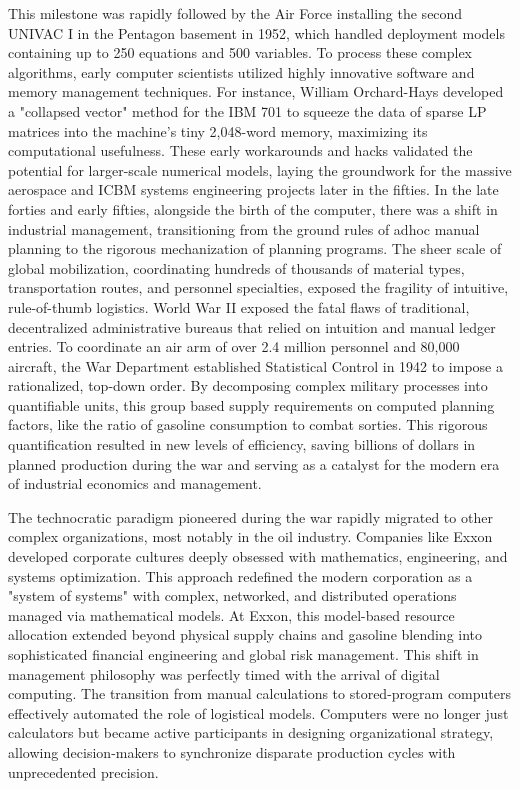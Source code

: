 This milestone was rapidly followed by the Air Force installing the second UNIVAC I in the Pentagon basement in 1952, which handled deployment models containing up to 250 equations and 500 variables. To process these complex algorithms, early computer scientists utilized highly innovative software and memory management techniques. For instance, William Orchard-Hays developed a "collapsed vector" method for the IBM 701 to squeeze the data of sparse LP matrices into the machine's tiny 2,048-word memory, maximizing its computational usefulness. These early workarounds and hacks validated the potential for larger-scale numerical models, laying the groundwork for the massive aerospace and ICBM systems engineering projects later in the fifties. In the late forties and early fifties, alongside the birth of the computer, there was a shift in industrial management, transitioning from the ground rules of adhoc manual planning to the rigorous mechanization of planning programs. The sheer scale of global mobilization, coordinating hundreds of thousands of material types, transportation routes, and personnel specialties, exposed the fragility of intuitive, rule-of-thumb logistics. World War II exposed the fatal flaws of traditional, decentralized administrative bureaus that relied on intuition and manual ledger entries. To coordinate an air arm of over 2.4 million personnel and 80,000 aircraft, the War Department established Statistical Control in 1942 to impose a rationalized, top-down order. By decomposing complex military processes into quantifiable units, this group based supply requirements on computed planning factors, like the ratio of gasoline consumption to combat sorties. This rigorous quantification resulted in new levels of efficiency, saving billions of dollars in planned production during the war and serving as a catalyst for the modern era of industrial economics and management. \cite{acombStatisticalControlArmy1952}

The technocratic paradigm pioneered during the war rapidly migrated to other complex organizations, most notably in the oil industry. Companies like Exxon developed corporate cultures deeply obsessed with mathematics, engineering, and systems optimization. This approach redefined the modern corporation as a "system of systems" with complex, networked, and distributed operations managed via mathematical models. At Exxon, this model-based resource allocation extended beyond physical supply chains and gasoline blending into sophisticated financial engineering and global risk management. This shift in management philosophy was perfectly timed with the arrival of digital computing. The transition from manual calculations to stored-program computers effectively automated the role of logistical models. Computers were no longer just calculators but became active participants in designing organizational strategy, allowing decision-makers to synchronize disparate production cycles with unprecedented precision. \cite{charnesBlendingAviationGasolines1952} \cite{garvinApplicationsLinearProgramming1957}

